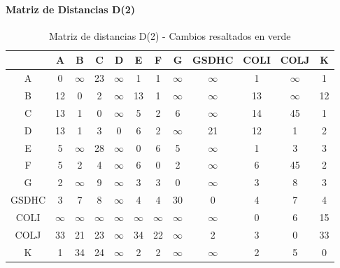 \documentclass[12pt]{article}
\begin{document}
\paragraph{Matriz de Distancias D(2)}
\begin{table}[h!]
\centering
\begin{tabular}{|c|c|c|c|c|c|c|c|c|c|c|c|}
\hline
 & A & B & C & D & E & F & G & GSDHC & COLI & COLJ & K \\\hline
A & 0 & $\infty$ & 23 & $\infty$ & 1 & 1 & $\infty$ & $\infty$ & 1 & $\infty$ & 1 \\\hline
B & 12 & 0 & 2 & $\infty$ & 13 & 1 & $\infty$ & $\infty$ & 13 & $\infty$ & 12 \\\hline
C & \cellcolor{lightgreen} 13 & 1 & 0 & $\infty$ & 5 & \cellcolor{lightgreen} 2 & 6 & $\infty$ & \cellcolor{lightgreen} 14 & 45 & 1 \\\hline
D & \cellcolor{lightgreen} 13 & 1 & \cellcolor{lightgreen} 3 & 0 & 6 & \cellcolor{lightgreen} 2 & $\infty$ & 21 & 12 & 1 & 2 \\\hline
E & 5 & $\infty$ & 28 & $\infty$ & 0 & 6 & 5 & $\infty$ & 1 & 3 & 3 \\\hline
F & 5 & 2 & \cellcolor{lightgreen} 4 & $\infty$ & 6 & 0 & 2 & $\infty$ & 6 & 45 & 2 \\\hline
G & 2 & $\infty$ & 9 & $\infty$ & 3 & 3 & 0 & $\infty$ & 3 & 8 & 3 \\\hline
GSDHC & 3 & 7 & 8 & $\infty$ & 4 & 4 & 30 & 0 & 4 & 7 & 4 \\\hline
COLI & $\infty$ & $\infty$ & $\infty$ & $\infty$ & $\infty$ & $\infty$ & $\infty$ & $\infty$ & 0 & 6 & 15 \\\hline
COLJ & \cellcolor{lightgreen} 33 & 21 & \cellcolor{lightgreen} 23 & $\infty$ & \cellcolor{lightgreen} 34 & \cellcolor{lightgreen} 22 & $\infty$ & 2 & 3 & 0 & \cellcolor{lightgreen} 33 \\\hline
K & 1 & 34 & 24 & $\infty$ & 2 & 2 & $\infty$ & $\infty$ & 2 & 5 & 0 \\\hline
\end{tabular}
\caption{Matriz de distancias D(2) - Cambios resaltados en verde}
\end{table}
\end{document}
